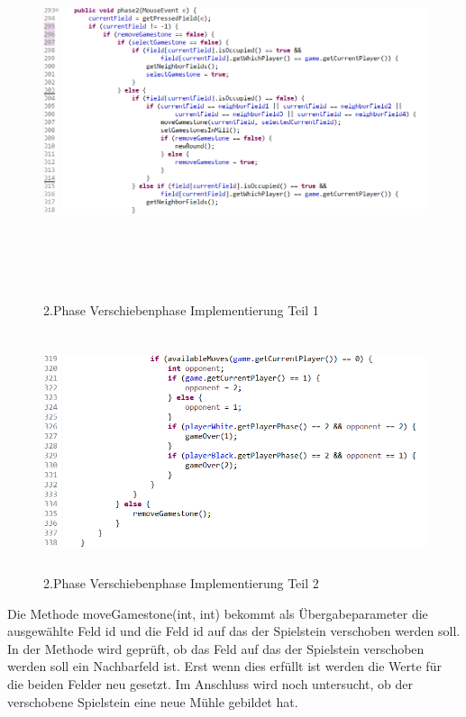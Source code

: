 \documentclass[oneside]{ausarbeitung}
\begin{document}
\begin{figure}[ht]
	\centering
	\includegraphics[width=15cm,height=11cm]{images/verschiebenphaseImplementierungTeil1.png}
	\caption[2. Phase Verschiebenphase Implementierung Teil 1]{2.Phase Verschiebenphase Implementierung Teil 1}
\end{figure}

\begin{figure}[ht]
	\centering
	\includegraphics[width=15cm,height=7cm]{images/verschiebenphaseImplementierungTeil2.png}
	\caption[2. Phase Verschiebenphase Implementierung Teil 2]{2.Phase Verschiebenphase Implementierung Teil 2}
\end{figure}

Die Methode moveGamestone(int, int) bekommt als Übergabeparameter die ausgewählte Feld id und die Feld id auf das der Spielstein verschoben werden soll. In der Methode wird geprüft, ob das Feld auf das der Spielstein verschoben werden soll ein Nachbarfeld ist. Erst wenn dies erfüllt ist werden die Werte für die beiden Felder neu gesetzt. Im Anschluss wird noch untersucht, ob der verschobene Spielstein eine neue Mühle gebildet hat.
\end{document}
